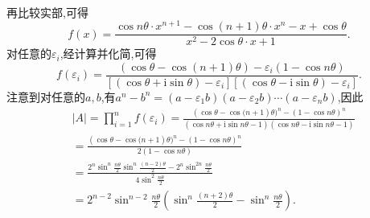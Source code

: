 \documentclass[../../main.tex]{subfiles}
\begin{document}
\begin{solution}
\begin{align*}
\end{align*}
再比较实部,可得
\[
f(x)=\frac{\cos n\theta\cdot x^{n + 1}-\cos(n + 1)\theta\cdot x^n - x+\cos\theta}{x^2 - 2\cos\theta\cdot x + 1}.
\]
对任意的\(\varepsilon_i\),经计算并化简,可得
\[
f(\varepsilon _i)=\frac{\left( \cos \theta -\cos \left( n+1 \right) \theta \right) -\varepsilon _i\left( 1-\cos n\theta \right)}{\left[ \left( \cos \theta +\mathrm{i}\sin \theta \right) -\varepsilon _i \right] \left[ \left( \cos \theta -\mathrm{i}\sin \theta \right) -\varepsilon _i \right]}.
\]
注意到对任意的\(a,b\),有\(a^n - b^n=(a - \varepsilon_1b)(a - \varepsilon_2b)\cdots(a - \varepsilon_nb)\),因此
\begin{align*}
&\left| A \right|=\prod_{i=1}^n{f(\varepsilon _i)}=\frac{(\cos \theta -\cos\mathrm{(}n+1)\theta )^n-(1-\cos n\theta )^n}{(\cos n\theta +\mathrm{i}\sin n\theta -1)(\cos n\theta -\mathrm{i}\sin n\theta -1)}
\\
&=\frac{(\cos \theta -\cos\mathrm{(}n+1)\theta )^n-(1-\cos n\theta )^n}{2(1-\cos n\theta )}
\\
&=\frac{2^n\sin ^n\frac{n\theta}{2}\sin ^n\frac{\left( n-2 \right) \theta}{2}-2^n\sin ^{2n}\frac{n\theta}{2}}{4\sin ^2\frac{n\theta}{2}}
\\
&=2^{n-2}\sin ^{n-2}\frac{n\theta}{2}\left( \sin ^n\frac{(n+2)\theta}{2}-\sin ^n\frac{n\theta}{2} \right) .
\end{align*}

\end{solution}
\end{document}
